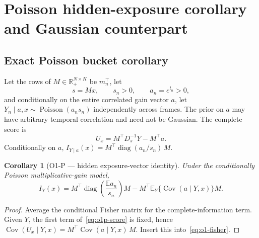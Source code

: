 \documentclass[11pt]{article}
\newcommand{\Cov}{\operatorname{Cov}}
\newcommand{\diag}{\operatorname{diag}}
\newcommand{\E}{\mathbb{E}}
\newtheorem{corollary}{Corollary}
\theoremstyle{remark}
\begin{document}
\section{Poisson hidden-exposure corollary and Gaussian counterpart}
\label{sec:o1p}
\subsection{Exact Poisson bucket corollary}
\label{sec:o1p-poisson}
Let the rows of $M\in\mathbb R_+^{N\times K}$ be $m_n^\top$, let
\begin{equation*}
s = Mx, \qquad s_n > 0, \qquad a_n = e^{l_n} > 0,
\end{equation*}
and conditionally on the entire correlated gain vector $a$, let
$Y_n\mid a,x \sim \operatorname{Poisson}(a_n s_n)$ independently across frames.
The prior on $a$ may have arbitrary temporal correlation and need not be
Gaussian. The complete score is
\begin{equation}
U_x = M^\top D_s^{-1} Y - M^\top a.
\tag{O1.3}\label{eq:o1p-score}
\end{equation}
Conditionally on $a$,
$I_{Y\mid a}(x) = M^\top \diag(a_n/s_n)\, M$.

\begin{corollary}[O1-P --- hidden exposure-vector identity]
\label{cor:o1p}
Under the conditionally Poisson multiplicative-gain model,
\begin{equation}
I_Y(x)
= M^\top \diag\!\left( \frac{\E a_n}{s_n} \right) M
- M^\top \E_Y\{ \Cov(a\mid Y,x) \} M.
\tag{O1.4}\label{eq:o1p-fisher}
\end{equation}
\end{corollary}

\begin{proof}
Average the conditional Fisher matrix for the complete-information term. Given
$Y$, the first term of~\eqref{eq:o1p-score} is fixed, hence
$\Cov(U_x\mid Y,x) = M^\top \Cov(a\mid Y,x)\, M$. Insert this
into~\eqref{eq:o1-fisher}.
\end{proof}
\end{document}
